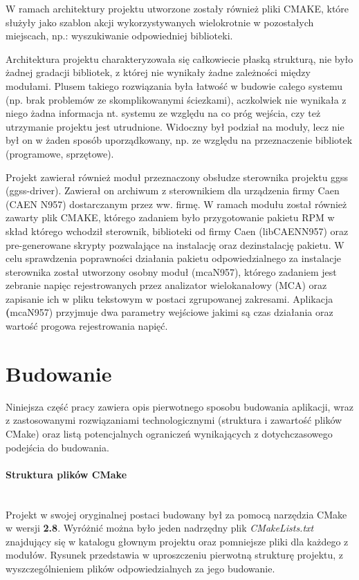 W ramach architektury projektu utworzone zostały również pliki CMAKE, które służyły jako szablon akcji wykorzystywanych wielokrotnie w pozostałych miejscach, np.: wyszukiwanie odpowiedniej biblioteki.\par 
Architektura projektu charakteryzowała się całkowiecie płaską strukturą, nie było żadnej gradacji bibliotek, z której nie wynikały żadne zależności między modułami. Plusem takiego rozwiązania była łatwość w budowie całego systemu (np. brak problemów ze skomplikowanymi ściezkami), aczkolwiek nie wynikała z niego żadna informacja nt. systemu ze względu na co próg wejścia, czy też utrzymanie projektu jest utrudnione. Widoczny był podział na moduły, lecz nie był on w żaden sposób uporządkowany, np. ze względu na przeznaczenie bibliotek (programowe, sprzętowe). 

\par Projekt zawierał również moduł przeznaczony obsłudze sterownika projektu ggss (ggss-driver). Zawierał on archiwum z sterownikiem dla urządzenia firmy Caen (CAEN N957) dostarczanym przez ww. firmę. W ramach modułu został również zawarty plik CMAKE, którego zadaniem było przygotowanie pakietu RPM w skład którego wchodził sterownik, biblioteki od firmy Caen (libCAENN957) oraz pre-generowane skrypty pozwalające na instalację oraz dezinstalację pakietu. W celu sprawdzenia poprawności działania pakietu odpowiedzialnego za instalacje sterownika został utworzony osobny moduł (mcaN957), którego zadaniem jest zebranie napięc rejestrowanych przez analizator wielokanałowy (MCA) oraz zapisanie ich w pliku tekstowym w postaci zgrupowanej zakresami. Aplikacja \textbf(mcaN957) przyjmuje dwa parametry wejściowe jakimi są czas działania oraz wartość progowa rejestrowania napięć.

\section{Budowanie} 
Niniejsza część pracy zawiera opis pierwotnego sposobu budowania aplikacji, wraz z zastosowanymi rozwiązaniami technologicznymi (struktura i zawartość plików CMake) oraz listą potencjalnych ograniczeń wynikających z dotychczasowego podejścia do budowania.

\paragraph*{Struktura plików CMake}\mbox{}\\
Projekt w swojej oryginalnej postaci budowany był za pomocą narzędzia CMake w wersji \textbf{2.8}. Wyróżnić można było jeden nadrzędny plik \textit{CMakeLists.txt} znajdujący się w katalogu głownym projektu oraz pomniejsze pliki dla każdego z modułów. Rysunek przedstawia w uproszczeniu pierwotną strukturę projektu, z wyszczególnieniem plików odpowiedzialnych za jego budowanie.

